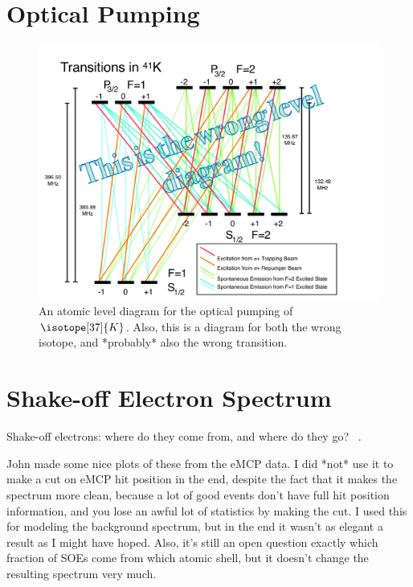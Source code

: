 \section{Optical Pumping}
\begin{figure}[h!!t]
	\centering
	\includegraphics[width=.999\linewidth]
	{Figures/OP_LevelDiagram}
	\caption{An atomic level diagram for the optical pumping of $\isotope[37]{K}$.  Also, this is a diagram for both the wrong isotope, and *probably* also the wrong transition.}	
	\label{fig:op_leveldiagram}
\end{figure}


\section{Shake-off Electron Spectrum}
Shake-off electrons:  where do they come from, and where do they go?  ~\cite{Levinger}.

John made some nice plots of these from the eMCP data.  I did *not* use it to make a cut on eMCP hit position in the end, despite the fact that it makes the spectrum more clean, because a lot of good events don't have full hit position information, and you lose an awful lot of statistics by making the cut.  I used this for modeling the background spectrum, but in the end it wasn't as elegant a result as I might have hoped.  Also, it's still an open question exactly which fraction of SOEs come from which atomic shell, but it doesn't change the resulting spectrum very much.


